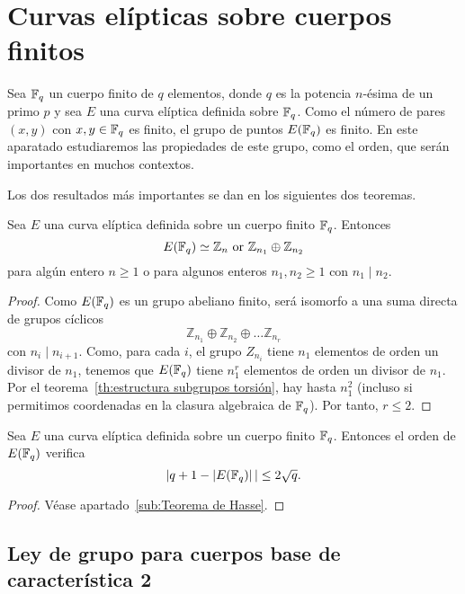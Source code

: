 \clearpage

\section{Curvas elípticas sobre cuerpos finitos}
\label{sec:Curvas elípticas sobre cuerpos finitos}

Sea $\mathbb{F}_q$ un cuerpo finito de $q$ elementos, donde $q$ es la potencia $n$-ésima de un primo $p$ y sea $E$ una curva elíptica definida sobre $\mathbb{F}_q$. Como el número de pares $(x, y)$ con $x, y \in \mathbb{F}_q$ es finito, el grupo de puntos $E(\mathbb{F}_q)$ es finito. En este aparatado estudiaremos las propiedades de este grupo, como el orden, que serán importantes en muchos contextos.

Los dos resultados más importantes se dan en los siguientes dos teoremas.

\begin{teorema}\label{th:estructura grupo puntos}
	Sea $E$ una curva elíptica definida sobre un cuerpo finito $\mathbb{F}_q$. Entonces
	$$
		E(\mathbb{F}_q) \simeq \mathbb{Z}_n \textrm{ or } \mathbb{Z}_{n_1} \oplus \mathbb{Z}_{n_2}
	$$
	para algún entero $n \ge 1$ o para algunos enteros $n_1, n_2 \ge 1$ con $n_1 \mid n_2$.
\end{teorema}
\begin{proof}
Como $E(\mathbb{F}_q)$ es un grupo abeliano finito, será isomorfo a una suma directa de grupos cíclicos
$$
	\mathbb{Z}_{n_1} \oplus \mathbb{Z}_{n_2} \oplus \dots \mathbb{Z}_{n_r}
$$
con $n_i \mid n_{i+1}$. Como, para cada $i$, el grupo $Z_{n_i}$ tiene $n_1$ elementos de orden un divisor de $n_1$, tenemos que $E(\mathbb{F}_q)$ tiene $n_1^r$ elementos de orden un divisor de $n_1$. Por el teorema~\ref{th:estructura subgrupos torsión}, hay hasta $n_1^2$ (incluso si permitimos coordenadas en la clasura algebraica de $\mathbb{F}_q$). Por tanto, $r \le 2$.
\end{proof}

\begin{teorema}
	Sea $E$ una curva elíptica definida sobre un cuerpo finito $\mathbb{F}_q$. Entonces el orden de $E(\mathbb{F}_q)$ verifica
	$$
		|q + 1 - \left\vert{E(\mathbb{F}_{q})}\right\vert| \le 2 \sqrt{q}.
	$$
\end{teorema}
\begin{proof}
	Véase apartado~\ref{sub:Teorema de Hasse}.
\end{proof}


\subsection{Ley de grupo para cuerpos base de característica 2}

